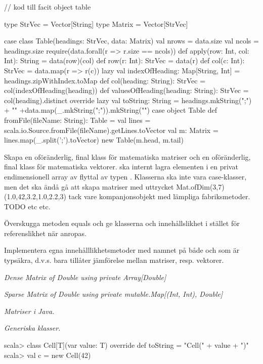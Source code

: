 \begin{CodeSmall}
// kod till facit
object table {
  type StrVec = Vector[String]
  type Matrix = Vector[StrVec]
  
  case class Table(headings: StrVec, data: Matrix){
    val nrows = data.size
    val ncols = headings.size
    require(data.forall(r => r.size == ncols))
    def apply(row: Int, col: Int): String = data(row)(col)
    def row(r: Int): StrVec = data(r)
    def col(c: Int): StrVec = data.map(r => r(c))
    lazy val indexOfHeading: Map[String, Int] = headings.zipWithIndex.toMap
    def col(heading: String): StrVec = col(indexOfHeading(heading)) 
    def valuesOfHeading(heading: String): StrVec = col(heading).distinct
    override lazy val toString: String = 
      headings.mkString(";") + "\n" +data.map(_.mkString(";")).mkString("\n")
  }
  case object Table {
    def fromFile(fileName: String): Table = {
      val lines = scala.io.Source.fromFile(fileName).getLines.toVector
      val m: Matrix  = lines.map(_.split(';').toVector) 
      new Table(m.head, m.tail)
    }
  }
}
\end{CodeSmall}


\Task Skapa en oföränderlig, final klass  för matematiska matriser och en oföränderlig, final klass  för matematiska vektorer.  ska internt lagra elementen i en privat endimensionell array av flyttal av typen . Klasserna ska inte vara case-klasser, men det ska ändå gå att skapa matriser med uttrycket Mat.ofDim(3,7)(1.0,42,3.2,1.0,2.2,3) tack vare  kompanjonsobjekt med lämpliga fabriksmetoder. TODO etc etc.

\Subtask Överskugga metoden equals och ge klasserna  och  innehållslikhet i stället för referenslikhet när \code{==} anropas.

\Subtask Implementera egna innehålllikhetsmetoder med namnet \code{===} på både  och  som är typsäkra, d.v.s. bara tillåter jämförelse mellan matriser, resp. vektorer.


\Task \emph{Dense Matrix of Double using private Array[Double]}


\Task \emph{Sparse Matrix of Double using private mutable.Map[(Int, Int), Double]}




\Task \emph{Matriser i Java.}





\Task \emph{Generiska klasser.} 

\begin{REPL}
scala> class Cell[T](var value: T){
         override def toString = "Cell(" + value + ")"
       }
scala> val c = new Cell(42)
\end{REPL}

